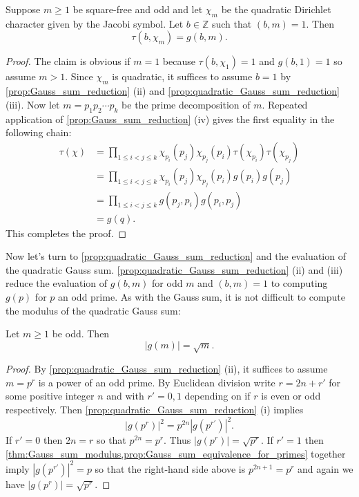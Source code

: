       \begin{theorem}
        Suppose $m \ge 1$ be square-free and odd and let $\chi_{m}$ be the quadratic Dirichlet character given by the Jacobi symbol. Let $b \in \mathbb{Z}$ such that $(b,m) = 1$. Then
        \[
          \tau(b,\chi_{m}) = g(b,m).
        \]
      \end{theorem}
      \begin{proof}
        The claim is obvious if $m = 1$ because $\tau(b,\chi_{1}) = 1$ and $g(b,1) = 1$ so assume $m > 1$. Since $\chi_{m}$ is quadratic, it suffices to assume $b = 1$ by \cref{prop:Gauss_sum_reduction} (ii) and \cref{prop:quadratic_Gauss_sum_reduction} (iii). Now let $m = p_{1}p_{2} \cdots p_{k}$ be the prime decomposition of $m$. Repeated application of \cref{prop:Gauss_sum_reduction} (iv) gives the first equality in the following chain:
        \begin{align*}
          \tau(\chi) &= \prod_{1 \le i < j \le k}\chi_{p_{i}}(p_{j})\chi_{p_{j}}(p_{i})\tau(\chi_{p_{i}})\tau(\chi_{p_{j}}) \\
          &= \prod_{1 \le i < j \le k}\chi_{p_{i}}(p_{j})\chi_{p_{j}}(p_{i})g(p_{i})g(p_{j}) \\
          &= \prod_{1 \le i < j \le k}g(p_{j},p_{i})g(p_{i},p_{j}) \\
          &= g(q).
        \end{align*}
        This completes the proof.
      \end{proof}

      Now let's turn to \cref{prop:quadratic_Gauss_sum_reduction} and the evaluation of the quadratic Gauss sum. \cref{prop:quadratic_Gauss_sum_reduction} (ii) and (iii) reduce the evaluation of $g(b,m)$ for odd $m$ and $(b,m) = 1$ to computing $g(p)$ for $p$ an odd prime. As with the Gauss sum, it is not difficult to compute the modulus of the quadratic Gauss sum:

      \begin{theorem}\label{thm:quadratic_Gauss_sum_modulus}
        Let $m \ge 1$ be odd. Then
        \[
          |g(m)| = \sqrt{m}.
        \]
      \end{theorem}
      \begin{proof}
        By \cref{prop:quadratic_Gauss_sum_reduction} (ii), it suffices to assume $m = p^{r}$ is a power of an odd prime. By Euclidean division write $r = 2n+r'$ for some positive integer $n$ and with $r' = 0,1$ depending on if $r$ is even or odd respectively. Then \cref{prop:quadratic_Gauss_sum_reduction} (i) implies
        \[
          |g(p^{r})|^{2} = p^{2n}|g(p^{r'})|^{2}.
        \]
        If $r' = 0$ then $2n = r$ so that $p^{2n} = p^{r}$. Thus $|g(p^{r})| = \sqrt{p^{r}}$. If $r' = 1$ then \cref{thm:Gauss_sum_modulus,prop:Gauss_sum_equivalence_for_primes} together imply $|g(p^{r'})|^{2} = p$ so that the right-hand side above is $p^{2n+1} = p^{r}$ and again we have $|g(p^{r})| = \sqrt{p^{r}}$.
      \end{proof}

